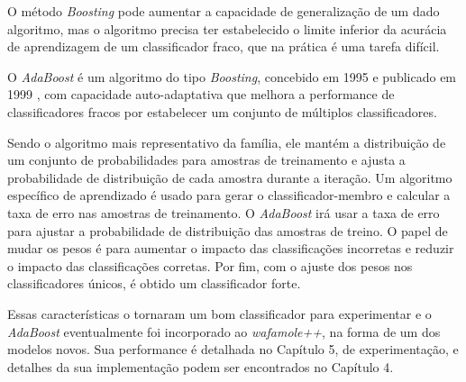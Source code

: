 O método \textit{Boosting} pode aumentar a capacidade de generalização de um dado algoritmo, mas o algoritmo precisa ter estabelecido o limite inferior da acurácia de aprendizagem de um classificador fraco, que na prática é uma tarefa difícil.

O \textit{AdaBoost} é um algoritmo do tipo \textit{Boosting}, concebido em 1995 e publicado em 1999 \cite{adaboostfreund1999short}, com capacidade auto-adaptativa que melhora a performance de classificadores fracos por estabelecer um conjunto de múltiplos classificadores. 

Sendo o algoritmo mais representativo da família, ele mantém a distribuição de um conjunto de probabilidades para amostras de treinamento e ajusta a probabilidade de distribuição de cada amostra durante a iteração. Um algoritmo específico de aprendizado é usado para gerar o classificador-membro e calcular a taxa de erro nas amostras de treinamento. O \textit{AdaBoost} irá usar a taxa de erro para ajustar a probabilidade de distribuição das amostras de treino. O papel de mudar os pesos é para aumentar o impacto das classificações incorretas e reduzir o impacto das classificações corretas. Por fim, com o ajuste dos pesos nos classificadores únicos, é obtido um classificador forte.

Essas características o tornaram um bom classificador para experimentar e o \textit{AdaBoost} eventualmente foi incorporado ao \textit{wafamole++}, na forma de um dos modelos novos. Sua performance é detalhada no Capítulo 5, de experimentação, e detalhes da sua implementação podem ser encontrados no Capítulo 4.








